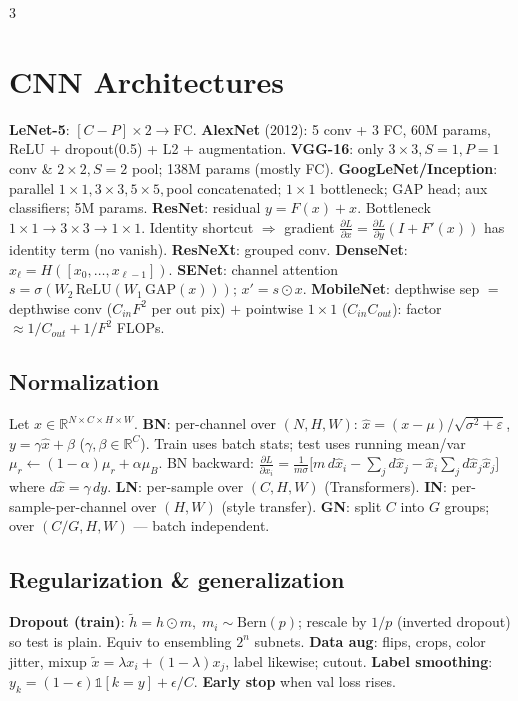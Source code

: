 \documentclass[a4paper,9pt,landscape]{scrartcl}
\newcommand{\R}{\mathbb{R}}
\newcommand{\relu}{\mathrm{ReLU}}
\newcommand{\dd}[2]{\frac{\partial #1}{\partial #2}}
\begin{document}
\begin{multicols*}{3}
\section{CNN Architectures}
\textbf{LeNet-5}: $[C{-}P]\!\times\!2\to\text{FC}$.
\textbf{AlexNet} (2012): 5 conv + 3 FC, 60M params, ReLU + dropout(0.5) + L2 + augmentation.
\textbf{VGG-16}: only $3{\times}3,S{=}1,P{=}1$ conv \& $2{\times}2,S{=}2$ pool; 138M params (mostly FC).
\textbf{GoogLeNet/Inception}: parallel $1{\times}1,3{\times}3,5{\times}5,$pool concatenated; $1{\times}1$ bottleneck; GAP head; aux classifiers; 5M params.
\textbf{ResNet}: residual $y=F(x)+x$. Bottleneck $1{\times}1{\to}3{\times}3{\to}1{\times}1$. Identity shortcut $\Rightarrow$ gradient $\dd{L}{x}=\dd{L}{y}(I+F'(x))$ has identity term (no vanish).
\textbf{ResNeXt}: grouped conv. \textbf{DenseNet}: $x_\ell=H([x_0,\dots,x_{\ell-1}])$. \textbf{SENet}: channel attention $s=\sigma(W_2\,\relu(W_1\,\text{GAP}(x)));\,x'=s\odot x$.
\textbf{MobileNet}: depthwise sep $=$ depthwise conv ($C_{in}F^2$ per out pix) $+$ pointwise $1{\times}1$ ($C_{in}C_{out}$): factor $\approx 1/C_{out}+1/F^2$ FLOPs.

\subsection{Normalization}
Let $x\in\R^{N\times C\times H\times W}$.
\textbf{BN}: per-channel over $(N,H,W)$: $\hat x=(x-\mu)/\sqrt{\sigma^2+\varepsilon}$, $y=\gamma\hat x+\beta$ ($\gamma,\beta\!\in\!\R^C$).
Train uses batch stats; test uses running mean/var $\mu_r\!\leftarrow\!(1{-}\alpha)\mu_r+\alpha\mu_B$.
BN backward: $\dd{L}{x_i}=\frac{1}{m\sigma}\!\big[m\,d\hat x_i-\!\sum_j d\hat x_j-\hat x_i\!\sum_j d\hat x_j\hat x_j\big]$ where $d\hat x=\gamma\,dy$.
\textbf{LN}: per-sample over $(C,H,W)$ (Transformers).
\textbf{IN}: per-sample-per-channel over $(H,W)$ (style transfer).
\textbf{GN}: split $C$ into $G$ groups; over $(C/G,H,W)$ — batch independent.

\subsection{Regularization \& generalization}
\textbf{Dropout (train)}: $\tilde h=h\odot m,\; m_i\!\sim\!\text{Bern}(p)$; rescale by $1/p$ (inverted dropout) so test is plain. Equiv to ensembling $2^n$ subnets.
\textbf{Data aug}: flips, crops, color jitter, mixup $\tilde x=\lambda x_i+(1-\lambda)x_j$, label likewise; cutout.
\textbf{Label smoothing}: $y_k=(1-\epsilon)\mathbb{1}[k{=}y]+\epsilon/C$.
\textbf{Early stop} when val loss rises.


\end{multicols*}
\end{document}
